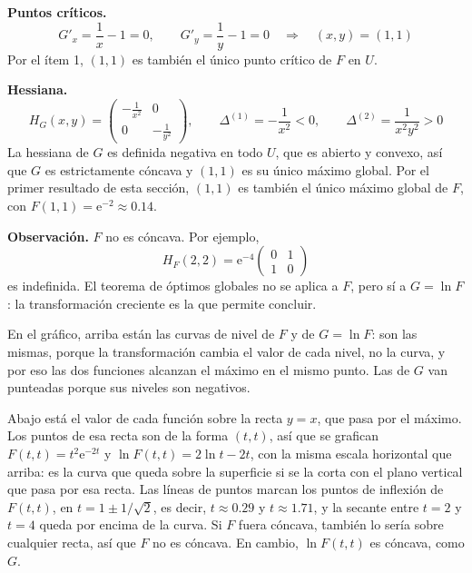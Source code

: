 \documentclass{article}
\begin{document}
\noindent\textbf{Puntos críticos.}
\[
G'_x=\frac1x-1=0,\qquad G'_y=\frac1y-1=0\quad\Longrightarrow\quad(x,y)=(1,1)
\]
Por el ítem 1, \((1,1)\) es también el único punto crítico de \(F\) en \(U\).

\medskip

\noindent\textbf{Hessiana.}
\[
H_G(x,y)=\begin{pmatrix}-\tfrac1{x^2}&0\\[4pt]0&-\tfrac1{y^2}\end{pmatrix},
\qquad
\Delta^{(1)}=-\frac1{x^2}<0,\qquad
\Delta^{(2)}=\frac1{x^2y^2}>0
\]
La hessiana de \(G\) es definida negativa en todo \(U\), que es abierto y convexo, así que \(G\) es estrictamente cóncava y \((1,1)\) es su único máximo global. Por el primer resultado de esta sección, \((1,1)\) es también el único máximo global de \(F\), con \(F(1,1)=\mathrm{e}^{-2}\approx 0.14\).

\medskip

\noindent\textbf{Observación.} \(F\) no es cóncava. Por ejemplo,
\[
H_F(2,2)=\mathrm{e}^{-4}\begin{pmatrix}0&1\\[4pt]1&0\end{pmatrix}
\]
es indefinida. El teorema de óptimos globales no se aplica a \(F\), pero sí a \(G=\ln F\): la transformación creciente es la que permite concluir.

\medskip

En el gráfico, arriba están las curvas de nivel de \(F\) y de \(G=\ln F\): son las mismas, porque la transformación cambia el valor de cada nivel, no la curva, y por eso las dos funciones alcanzan el máximo en el mismo punto. Las de \(G\) van punteadas porque sus niveles son negativos.

Abajo está el valor de cada función sobre la recta \(y=x\), que pasa por el máximo. Los puntos de esa recta son de la forma \((t,t)\), así que se grafican \(F(t,t)=t^2\mathrm{e}^{-2t}\) y \(\ln F(t,t)=2\ln t-2t\), con la misma escala horizontal que arriba: es la curva que queda sobre la superficie si se la corta con el plano vertical que pasa por esa recta. Las líneas de puntos marcan los puntos de inflexión de \(F(t,t)\), en \(t=1\pm1/\sqrt2\), es decir, \(t\approx0.29\) y \(t\approx1.71\), y la secante entre \(t=2\) y \(t=4\) queda por encima de la curva. Si \(F\) fuera cóncava, también lo sería sobre cualquier recta, así que \(F\) no es cóncava. En cambio, \(\ln F(t,t)\) es cóncava, como \(G\).
\end{document}
